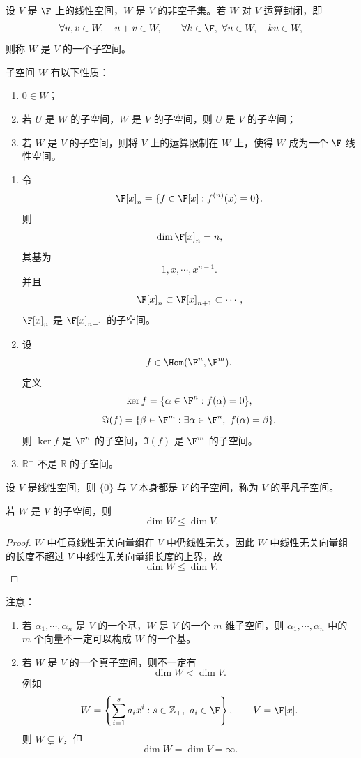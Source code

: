\begin{definition}[子空间]
	设 $V$ 是 $\F$ 上的线性空间，$W$ 是 $V$ 的非空子集。若 $W$ 对 $V$ 运算封闭，即
	\[
	\forall u,v\in W,\quad u+v\in W,
	\qquad
	\forall k\in\F,\ \forall u\in W,\quad ku\in W,
	\]
	则称 $W$ 是 $V$ 的一个子空间。
	

\end{definition}
	子空间 $W$ 有以下性质：
\begin{enumerate}
	\item $0\in W$；
	\item 若 $U$ 是 $W$ 的子空间，$W$ 是 $V$ 的子空间，则 $U$ 是 $V$ 的子空间；
	\item 若 $W$ 是 $V$ 的子空间，则将 $V$ 上的运算限制在 $W$ 上，使得 $W$ 成为一个 $\F$-线性空间。
\end{enumerate}
\begin{example}
	\begin{enumerate}
		\item 令
		\[
		\F[x]_n=\{f\in\F[x]:f^{(n)}(x)=0\}.
		\]
		则
		\[
		\dim\F[x]_n=n,
		\]
		其基为
		\[
		1,x,\cdots,x^{n-1}.
		\]
		并且
		\[
		\F[x]_n\subset \F[x]_{n+1}\subset\cdots,
		\]
		$\F[x]_n$ 是 $\F[x]_{n+1}$ 的子空间。
		
		\item 设
		\[
		f\in\Hom(\F^n,\F^m).
		\]
		定义
		\[
		\ker f=\{\alpha\in\F^n:f(\alpha)=0\},
		\]
		\[
		\Im(f)=\{\beta\in\F^m:\exists \alpha\in\F^n,\ f(\alpha)=\beta\}.
		\]
		则 $\ker f$ 是 $\F^n$ 的子空间，$\Im(f)$ 是 $\F^m$ 的子空间。
		
		\item $\mathbb{R}^{+}$ 不是 $\mathbb{R}$ 的子空间。
	\end{enumerate}
\end{example}

\begin{definition}[平凡子空间]
	设 $V$ 是线性空间，则 $\{0\}$ 与 $V$ 本身都是 $V$ 的子空间，称为 $V$ 的平凡子空间。
\end{definition}

\begin{lemma}
	若 $W$ 是 $V$ 的子空间，则
	\[
	\dim W\leq \dim V.
	\]
\end{lemma}

\begin{proof}
	$W$ 中任意线性无关向量组在 $V$ 中仍线性无关，因此 $W$ 中线性无关向量组的长度不超过 $V$ 中线性无关向量组长度的上界，故
	\[
	\dim W\leq \dim V.
	\]
\end{proof}

注意：
\begin{enumerate}
	\item 若 $\alpha_1,\cdots,\alpha_n$ 是 $V$ 的一个基，$W$ 是 $V$ 的一个 $m$ 维子空间，则 $\alpha_1,\cdots,\alpha_n$ 中的 $m$ 个向量不一定可以构成 $W$ 的一个基。
	
	\item 若 $W$ 是 $V$ 的一个真子空间，则不一定有
	\[
	\dim W<\dim V.
	\]
	例如
	\[
	W=\left\{\sum_{i=1}^{s}a_i x^i:s\in\mathbb{Z}_{+},\ a_i\in\F\right\},
	\qquad
	V=\F[x].
	\]
	则 $W\subsetneq V$，但
	\[
	\dim W=\dim V=\infty.
	\]
\end{enumerate}

